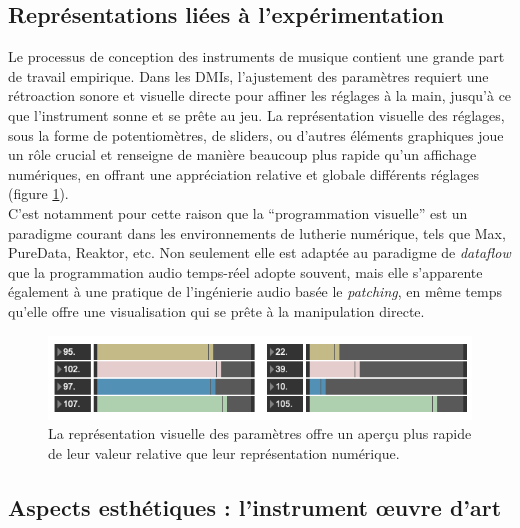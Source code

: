 \subsection{Représentations liées à l'expérimentation}

\noindent Le processus de conception des instruments de musique contient une grande part de travail empirique. Dans les \glspl{DMI}, l'ajustement des paramètres requiert une rétroaction sonore et visuelle directe pour affiner les réglages à la main, jusqu'à ce que l'instrument sonne et se prête au jeu. La représentation visuelle des réglages, sous la forme de potentiomètres, de sliders, ou d'autres éléments graphiques joue un rôle crucial et renseigne de manière beaucoup plus rapide qu'un affichage numériques, en offrant une appréciation relative et globale différents réglages (figure \ref{fig:visual_representation:numbers-vs-sliders}).\\
\indent C'est notamment pour cette raison que la ``programmation visuelle'' est un paradigme courant dans les environnements de lutherie numérique, tels que Max, PureData, Reaktor, etc. Non seulement elle est adaptée au paradigme de \textit{dataflow} que la programmation audio temps-réel adopte souvent, mais elle s'apparente également à une pratique de l'ingénierie audio basée le \textit{patching}, en même temps qu'elle offre une visualisation qui se prête à la manipulation directe.

\begin{figure}[!htbp]
	\captionsetup{format=plain}%
	\includegraphics[width=\textwidth]{gfx/06_visual_representation/NumbersVsSliders.png}
	\caption[Représentation numérique et visuelle des paramètres]{La représentation visuelle des paramètres offre un aperçu plus rapide de leur valeur relative que leur représentation numérique.}
	\label{fig:visual_representation:numbers-vs-sliders}
\end{figure}

\subsection{Aspects esthétiques : l'instrument œuvre d'art}

